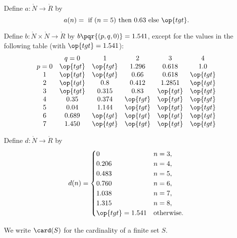 \begin{definition}[a]
  Define $a:\ring{N}\to \ring{R}$ by
  $$
  a(n) = \hbox{ if } (n=5) \hbox{ then } 0.63 \hbox{ else } \op{tgt}.
  $$
\end{definition}

\begin{definition}[b]
  Define $b:\ring{N}\times \ring{N}\to \ring{R}$ by $b\pqr{(p,q,0)}=1.541$,
  except for the values in the following table
  (with  $\op{tgt}=1.541$):
  {
  \def\tx{\op{tgt}}
  $$\begin{matrix}  &q=0&1&2&3&4\\
           p=0&\tx&\tx&1.296&0.618&1.0\\
           1&\tx&\tx&0.66&0.618&\tx\\
           2&\tx&0.8&0.412&1.2851&\tx\\
           3&\tx&0.315&0.83&\tx&\tx\\
           4&0.35&0.374&\tx&\tx&\tx\\
           5&0.04&1.144&\tx&\tx&\tx\\
           6&0.689&\tx&\tx&\tx&\tx\\
           7&1.450&\tx&\tx&\tx&\tx
   \end{matrix}
   $$
   }
\end{definition}


\begin{definition}[d]
    Define $d:\ring{N}\to \ring{R}$ by
  $$d(n) = \begin{cases}
    0 & n=3, \\
    0.206 & n=4, \\
    0.483 & n=5, \\
    0.760 & n=6, \\
    1.038 & n=7, \\
    1.315 & n=8,\\
    \op{tgt}=1.541 & \text{otherwise}.
  \end{cases}
  $$
\end{definition}


We write $\card(S)$ for the cardinality of a finite set $S$.


